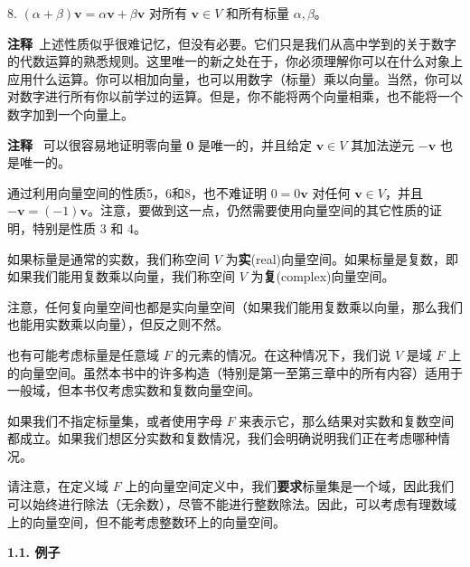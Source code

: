 8. $(\alpha + \beta) \mathbf{v} = \alpha \mathbf{v} + \beta \mathbf{v}$ 对所有 $\mathbf{v} \in V$ 和所有标量 $\alpha, \beta$。

 \textbf{注释}~上述性质似乎很难记忆，但没有必要。它们只是我们从高中学到的关于数字的代数运算的熟悉规则。这里唯一的新之处在于，你必须理解你可以在什么对象上应用什么运算。你可以相加向量，也可以用数字（标量）乘以向量。当然，你可以对数字进行所有你以前学过的运算。但是，你不能将两个向量相乘，也不能将一个数字加到一个向量上。

\textbf{注释} ~可以很容易地证明零向量 $\mathbf{0}$ 是唯一的，并且给定 $\mathbf{v} \in V$ 其加法逆元 $-\mathbf{v}$ 也是唯一的。

通过利用向量空间的性质5，6和8，也不难证明 $0 = 0 \mathbf{v}$ 对任何 $\mathbf{v} \in V$，并且 $-\mathbf{v} = (-1)\mathbf{v}$。注意，要做到这一点，仍然需要使用向量空间的其它性质的证明，特别是性质 3 和 4。


如果标量是通常的实数，我们称空间 $V$ 为\textbf{实}(real)向量空间。如果标量是复数，即如果我们能用复数乘以向量，我们称空间 $V$ 为\textbf{复}(complex)向量空间。

注意，任何复向量空间也都是实向量空间（如果我们能用复数乘以向量，那么我们也能用实数乘以向量），但反之则不然。

也有可能考虑标量是任意域 $F$ 的元素的情况。在这种情况下，我们说 $V$ 是域 $F$ 上的向量空间。虽然本书中的许多构造（特别是第一至第三章中的所有内容）适用于一般域，但本书仅考虑实数和复数向量空间。

如果我们不指定标量集，或者使用字母 $F$ 来表示它，那么结果对实数和复数空间都成立。如果我们想区分实数和复数情况，我们会明确说明我们正在考虑哪种情况。

请注意，在定义域 $F$ 上的向量空间定义中，我们\textbf{要求}标量集是一个域，因此我们可以始终进行除法（无余数），尽管不能进行整数除法。因此，可以考虑有理数域上的向量空间，但不能考虑整数环上的向量空间。





\textbf{1.1. 例子}

